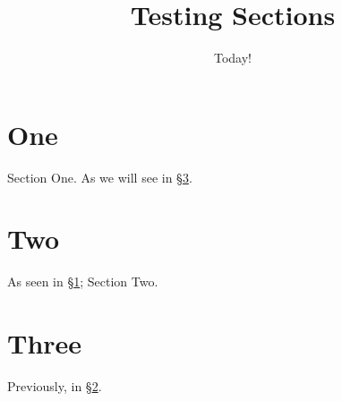\documentclass{article}
\title{Testing Sections}
\date{Today!}
\begin{document}
\maketitle
\section{One}\label{sec:one}
Section One. As we will see in \S\ref{sec:three}.
\section{Two}\label{sec:two}
As seen in \S\ref{sec:one}; Section Two.
\section{Three}\label{sec:three}
Previously, in \S\ref{sec:two}.
\end{document}
